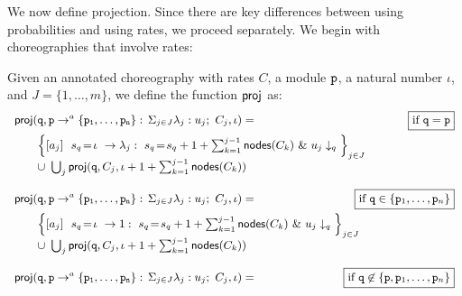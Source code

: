 We now define projection. Since there are key differences between
using probabilities and using rates, we proceed separately. We begin
with choreographies that involve rates:
% 
\begin{definition}\label{def:projCTMC} Given an
  annotated choreography with rates $C$, a module $\mathtt{p}$, a natural
  number $\iota$, and $J=\{1,\dots,m\}$, we define the function
  $\mathsf{proj}$ as:
  \begin{displaymath}\small
        \begin{array}{lr}

          \proj (\role q,\interactl{p}{a}{\role p_1,\ldots,\role p_n}, \iota)= 
          &  \boxed{\text{if }\role q=\role p}\\[2mm]
          \qquad
          \Big\{\commandBase {a_j} {\ s_{q}\!=\! \iota} {\lambda_j:\ s_{q}\!=\!
          s_{q} +1+\sum_{k=1}^{j-1}\mathsf{nodes}({C_k})}\ \&\ \projE
          {u_j}q\Big\}_{j\in J}
          \\
          \qquad\cup\ \bigcup_{j} \proj (\role q, C_j, \iota+1+\sum_{k=1}^{j-1}\mathsf{nodes}({C_k}))
          
          \\\\
          
          
          \proj (\role q,\interactl{p}{a}{\role p_1,\ldots,\role p_n}, \iota)= 
          &  \!\!\!\!\!\! \!\!\!\!\!\!\boxed{\text{if }\role q\in\{\role p_1,\ldots,\role p_n\}}\\[2mm]
          \qquad
          \Big\{\commandBase {a_j} {\ s_{q}\!=\! \iota} {1:\ s_{q}\!=\!
          s_{q} +1+\sum_{k=1}^{j-1}\mathsf{nodes}({C_k})}\ \&\ \projE
          {u_j}q\Big\}_{j\in J}
          \\
          \qquad\cup\ \bigcup_{j} \proj (\role q, C_j, \iota+1+\sum_{k=1}^{j-1}\mathsf{nodes}({C_k}))

          \\\\

          \proj (\role q,\interactl{p}a{\role p_1,\ldots,\role p_n}, \iota)=
          &  \hspace{-1.8cm}\boxed{\text{if }\role q\not\in\{\role p, 
            \role p_1,\ldots,\role p_n\}}
          \\[2mm]


\end{array}
\end{displaymath}
\end{definition}
